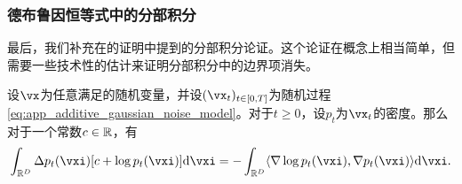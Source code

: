 \documentclass[../../book-main_zh.tex]{subfiles}
\begin{document}
\subsubsection{德布鲁因恒等式中的分部积分}

最后，我们补充在的证明中提到的分部积分论证。这个论证在概念上相当简单，但需要一些技术性的估计来证明分部积分中的边界项消失。

\begin{lemma}\label{lem:diffusion_ibp}
    设\(\vx\)为任意满足的随机变量，并设\((\vx_{t})_{t \in [0, T]}\)为随机过程\eqref{eq:app_additive_gaussian_noise_model}。对于\(t \geq 0\)，设\(p_{t}\)为\(\vx_{t}\)的密度。那么对于一个常数\(c \in \mathbb{R}\)，有
    \begin{equation}
        \int_{\R^{D}}\Delta p_{t}(\vxi)[c + \log p_{t}(\vxi)]\odif{\vxi} = -\int_{\R^{D}}\ip{\nabla \log p_{t}(\vxi)}{\nabla p_{t}(\vxi)}\odif{\vxi}.
    \end{equation}
\end{lemma}
\end{document}

